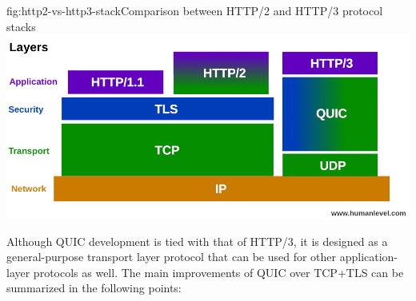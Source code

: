 \begin{myFigure}{fig:http2-vs-http3-stack}{Comparison between HTTP/2 and HTTP/3 protocol stacks}
  \includegraphics[width=\textwidth]{img/01-pile-http-protocol}
\end{myFigure}


Although QUIC development is tied with that of HTTP/3, it is designed as a general-purpose transport
layer protocol that can be used for other application-layer protocols as well. The main improvements
of QUIC over TCP+TLS can be summarized in the following points:

